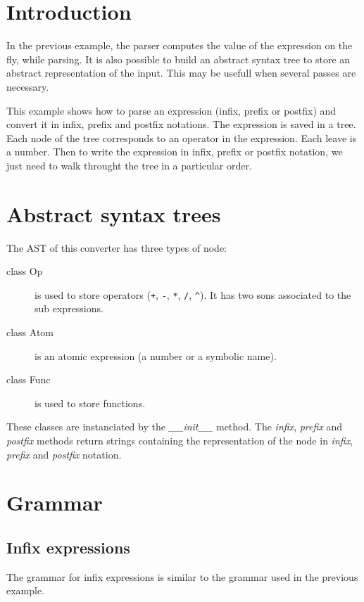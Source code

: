 \section{Introduction}

In the previous example, the parser computes the value of the expression on the fly, while parsing.
It is also possible to build an abstract syntax tree to store an abstract representation of the input.
This may be usefull when several passes are necessary.

This example shows how to parse an expression (infix, prefix or postfix) and convert it in infix, prefix and postfix notations.
The expression is saved in a tree. Each node of the tree corresponds to an operator in the expression. Each leave is a number.
Then to write the expression in infix, prefix or postfix notation, we just need to walk throught the tree in a particular order.

\section{Abstract syntax trees}

The AST of this converter has three types of node:

\begin{description}
    \item [class Op] is used to store operators (\verb$+$, \verb$-$, \verb$*$, \verb$/$, \verb$^$).
        It has two sons associated to the sub expressions.
    \item [class Atom] is an atomic expression (a number or a symbolic name).
    \item [class Func] is used to store functions.
\end{description}

These classes are instanciated by the \emph{\_\_init\_\_} method. The \emph{infix}, \emph{prefix} and \emph{postfix} methods return strings containing the representation of the node in \emph{infix}, \emph{prefix} and \emph{postfix} notation.

\section{Grammar}

\subsection{Infix expressions}

The grammar for infix expressions is similar to the grammar used in the previous example.

